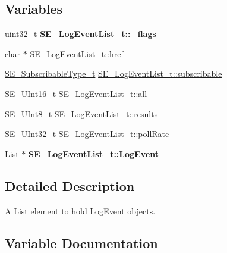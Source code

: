 \subsection*{Variables}
\begin{DoxyCompactItemize}
\item 
\mbox{\label{group__LogEventList_gae960d38cd55dcdb637b2a418f6131a28}} 
uint32\+\_\+t {\bfseries S\+E\+\_\+\+Log\+Event\+List\+\_\+t\+::\+\_\+flags}
\item 
char $\ast$ \hyperlink{group__LogEventList_ga2adcec0539539616990cb3ab699bc9e0}{S\+E\+\_\+\+Log\+Event\+List\+\_\+t\+::href}
\item 
\hyperlink{group__SubscribableType_ga5c41f553d369710ed34619266bf2551e}{S\+E\+\_\+\+Subscribable\+Type\+\_\+t} \hyperlink{group__LogEventList_ga56149eb351e449cbb2722991e2daa1bc}{S\+E\+\_\+\+Log\+Event\+List\+\_\+t\+::subscribable}
\item 
\hyperlink{group__UInt16_gac68d541f189538bfd30cfaa712d20d29}{S\+E\+\_\+\+U\+Int16\+\_\+t} \hyperlink{group__LogEventList_gac1fb1159b6c4504d77ae255eb3d36e17}{S\+E\+\_\+\+Log\+Event\+List\+\_\+t\+::all}
\item 
\hyperlink{group__UInt8_gaf7c365a1acfe204e3a67c16ed44572f5}{S\+E\+\_\+\+U\+Int8\+\_\+t} \hyperlink{group__LogEventList_ga6cfbe323819724f04cdb2a6ee4300628}{S\+E\+\_\+\+Log\+Event\+List\+\_\+t\+::results}
\item 
\hyperlink{group__UInt32_ga70bd4ecda3c0c85d20779d685a270cdb}{S\+E\+\_\+\+U\+Int32\+\_\+t} \hyperlink{group__LogEventList_ga388cf556e1a06ced33e78bbac0c0ab88}{S\+E\+\_\+\+Log\+Event\+List\+\_\+t\+::poll\+Rate}
\item 
\mbox{\label{group__LogEventList_gac6e18e732845e2abfcc33093d3f86b6b}} 
\hyperlink{structList}{List} $\ast$ {\bfseries S\+E\+\_\+\+Log\+Event\+List\+\_\+t\+::\+Log\+Event}
\end{DoxyCompactItemize}


\subsection{Detailed Description}
A \hyperlink{structList}{List} element to hold Log\+Event objects. 

\subsection{Variable Documentation}
\mbox{\label{group__LogEventList_gac1fb1159b6c4504d77ae255eb3d36e17}} 
